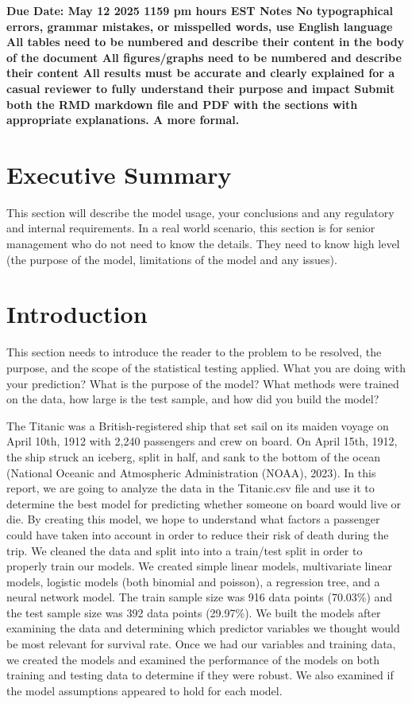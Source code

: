\documentclass[
  letterpaper,
  DIV=11,
  numbers=noendperiod]{scrartcl}
\begin{document}
\textbf{Due Date: May 12 2025 1159 pm hours EST Notes No typographical
errors, grammar mistakes, or misspelled words, use English language All
tables need to be numbered and describe their content in the body of the
document All figures/graphs need to be numbered and describe their
content All results must be accurate and clearly explained for a casual
reviewer to fully understand their purpose and impact Submit both the
RMD markdown file and PDF with the sections with appropriate
explanations. A more formal.}

\section{Executive Summary}\label{executive-summary}

This section will describe the model usage, your conclusions and any
regulatory and internal requirements. In a real world scenario, this
section is for senior management who do not need to know the details.
They need to know high level (the purpose of the model, limitations of
the model and any issues).

\section{Introduction}\label{introduction}

This section needs to introduce the reader to the problem to be
resolved, the purpose, and the scope of the statistical testing applied.
What you are doing with your prediction? What is the purpose of the
model? What methods were trained on the data, how large is the test
sample, and how did you build the model?

The Titanic was a British-registered ship that set sail on its maiden
voyage on April 10th, 1912 with 2,240 passengers and crew on board. On
April 15th, 1912, the ship struck an iceberg, split in half, and sank to
the bottom of the ocean (National Oceanic and Atmospheric Administration
(NOAA), 2023). In this report, we are going to analyze the data in the
Titanic.csv file and use it to determine the best model for predicting
whether someone on board would live or die. By creating this model, we
hope to understand what factors a passenger could have taken into
account in order to reduce their risk of death during the trip. We
cleaned the data and split into into a train/test split in order to
properly train our models. We created simple linear models, multivariate
linear models, logistic models (both binomial and poisson), a regression
tree, and a neural network model. The train sample size was 916 data
points (70.03\%) and the test sample size was 392 data points (29.97\%).
We built the models after examining the data and determining which
predictor variables we thought would be most relevant for survival rate.
Once we had our variables and training data, we created the models and
examined the performance of the models on both training and testing data
to determine if they were robust. We also examined if the model
assumptions appeared to hold for each model.
\end{document}
